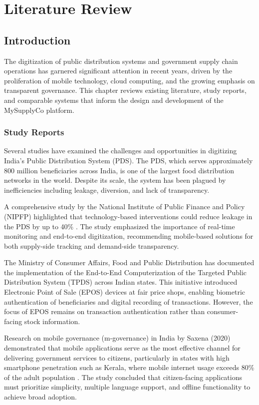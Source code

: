 \chapter{Literature Review}

\section{Introduction}

The digitization of public distribution systems and government supply chain operations has garnered significant attention in recent years, driven by the proliferation of mobile technology, cloud computing, and the growing emphasis on transparent governance. This chapter reviews existing literature, study reports, and comparable systems that inform the design and development of the MySupplyCo platform.

\subsection{Study Reports}

Several studies have examined the challenges and opportunities in digitizing India's Public Distribution System (PDS). The PDS, which serves approximately 800 million beneficiaries across India, is one of the largest food distribution networks in the world. Despite its scale, the system has been plagued by inefficiencies including leakage, diversion, and lack of transparency.

A comprehensive study by the National Institute of Public Finance and Policy (NIPFP) highlighted that technology-based interventions could reduce leakage in the PDS by up to 40\% \cite{nipfp_pds}. The study emphasized the importance of real-time monitoring and end-to-end digitization, recommending mobile-based solutions for both supply-side tracking and demand-side transparency.

The Ministry of Consumer Affairs, Food and Public Distribution has documented the implementation of the End-to-End Computerization of the Targeted Public Distribution System (TPDS) across Indian states. This initiative introduced Electronic Point of Sale (EPOS) devices at fair price shops, enabling biometric authentication of beneficiaries and digital recording of transactions. However, the focus of EPOS remains on transaction authentication rather than consumer-facing stock information.

Research on mobile governance (m-governance) in India by Saxena (2020) demonstrated that mobile applications serve as the most effective channel for delivering government services to citizens, particularly in states with high smartphone penetration such as Kerala, where mobile internet usage exceeds 80\% of the adult population \cite{saxena_mgovern}. The study concluded that citizen-facing applications must prioritize simplicity, multiple language support, and offline functionality to achieve broad adoption.

